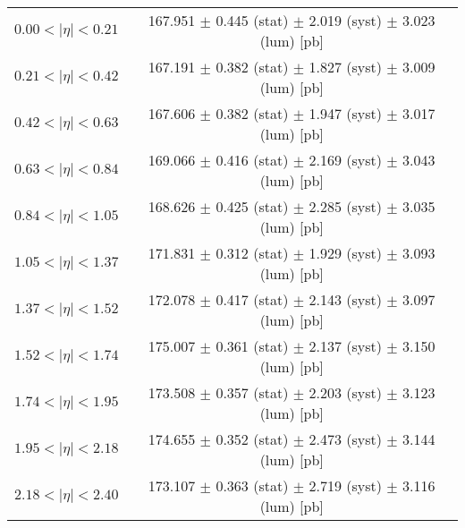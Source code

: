 \begin{tabular}{lc}
\hline
$0.00 < |\eta| <0.21$          & 167.951 $\pm$ 0.445 (stat) $\pm$ 2.019 (syst) $\pm$ 3.023 (lum) [pb]  \\
$0.21 < |\eta| <0.42$          & 167.191 $\pm$ 0.382 (stat) $\pm$ 1.827 (syst) $\pm$ 3.009 (lum) [pb]  \\
$0.42 < |\eta| <0.63$          & 167.606 $\pm$ 0.382 (stat) $\pm$ 1.947 (syst) $\pm$ 3.017 (lum) [pb]  \\
$0.63 < |\eta| <0.84$          & 169.066 $\pm$ 0.416 (stat) $\pm$ 2.169 (syst) $\pm$ 3.043 (lum) [pb]  \\
$0.84 < |\eta| <1.05$          & 168.626 $\pm$ 0.425 (stat) $\pm$ 2.285 (syst) $\pm$ 3.035 (lum) [pb]  \\
$1.05 < |\eta| <1.37$          & 171.831 $\pm$ 0.312 (stat) $\pm$ 1.929 (syst) $\pm$ 3.093 (lum) [pb]  \\
$1.37 < |\eta| <1.52$          & 172.078 $\pm$ 0.417 (stat) $\pm$ 2.143 (syst) $\pm$ 3.097 (lum) [pb]  \\
$1.52 < |\eta| <1.74$          & 175.007 $\pm$ 0.361 (stat) $\pm$ 2.137 (syst) $\pm$ 3.150 (lum) [pb]  \\
$1.74 < |\eta| <1.95$          & 173.508 $\pm$ 0.357 (stat) $\pm$ 2.203 (syst) $\pm$ 3.123 (lum) [pb]  \\
$1.95 < |\eta| <2.18$          & 174.655 $\pm$ 0.352 (stat) $\pm$ 2.473 (syst) $\pm$ 3.144 (lum) [pb]  \\
$2.18 < |\eta| <2.40$          & 173.107 $\pm$ 0.363 (stat) $\pm$ 2.719 (syst) $\pm$ 3.116 (lum) [pb]  \\
\hline
\end{tabular}
